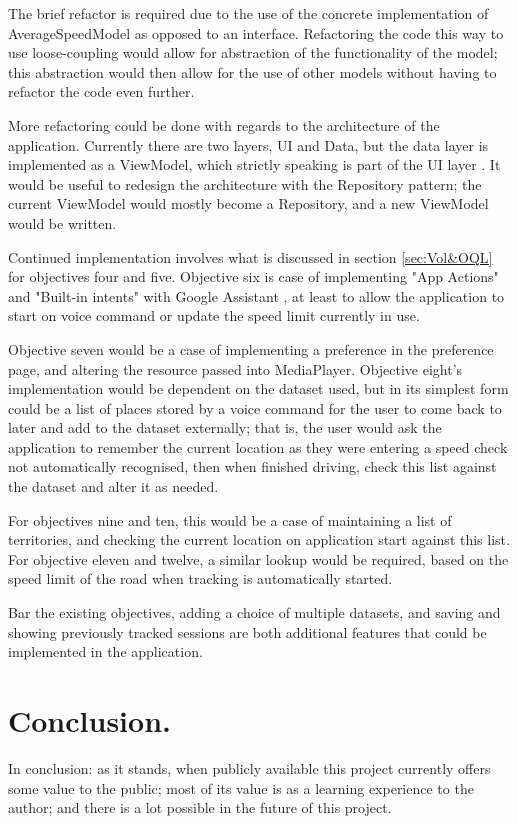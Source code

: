 \documentclass[11pt, a4paper, notitlepage]{report}
\begin{document}
The brief refactor is required due to the use of the concrete implementation of AverageSpeedModel as opposed to an interface. Refactoring the code this way to use loose-coupling would allow for abstraction of the functionality of the model; this abstraction would then allow for the use of other models without having to refactor the code even further.

More refactoring could be done with regards to the architecture of the application. Currently there are two layers, UI and Data, but the data layer is implemented as a ViewModel, which strictly speaking is part of the UI layer \citep{UILayerAndroid}. It would be useful to redesign the architecture with the Repository pattern; the current ViewModel would mostly become a Repository, and a new ViewModel would be written.

Continued implementation involves what is discussed in section \ref{sec:Vol&OQL} for objectives four and five. Objective six is case of implementing "App Actions" and "Built-in intents" with Google Assistant \citep{appActionsBII}, at least to allow the application to start on voice command or update the speed limit currently in use.

Objective seven would be a case of implementing a preference in the preference page, and altering the resource passed into MediaPlayer. Objective eight's implementation would be dependent on the dataset used, but in its simplest form could be a list of places stored by a voice command for the user to come back to later and add to the dataset externally; that is, the user would ask the application to remember the current location as they were entering a speed check not automatically recognised, then when finished driving, check this list against the dataset and alter it as needed.

For objectives nine and ten, this would be a case of maintaining a list of territories, and checking the current location on application start against this list. For objective eleven and twelve, a similar lookup would be required, based on the speed limit of the road when tracking is automatically started.

Bar the existing objectives, adding a choice of multiple datasets, and saving and showing previously tracked sessions are both additional features that could be implemented in the application.

\section{Conclusion.}
In conclusion: as it stands, when publicly available this project currently offers some value to the public; most of its value is as a learning experience to the author; and there is a lot possible in the future of this project.
\end{document}
